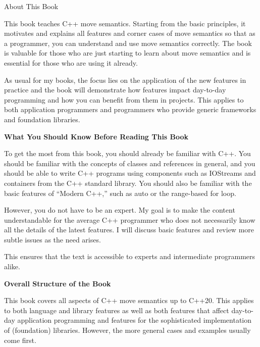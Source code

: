 \begin{flushright}
	 About This Book
\end{flushright}

This book teaches C++ move semantics. Starting from the basic principles, it motivates and explains all features and corner cases of move semantics so that as a programmer, you can understand and use move semantics correctly. The book is valuable for those who are just starting to learn about move semantics and
is essential for those who are using it already.\par

As usual for my books, the focus lies on the application of the new features in practice and the book will demonstrate how features impact day-to-day programming and how you can benefit from them in projects. This applies to both application programmers and programmers who provide generic frameworks and foundation libraries.\par

\hspace*{\fill} \par %
\textbf{What You Should Know Before Reading This Book}

To get the most from this book, you should already be familiar with C++. You should be familiar with the concepts of classes and references in general, and you should be able to write C++ programs using components such as IOStreams and containers from the C++ standard library. You should also be familiar with the basic features of “Modern C++,” such as auto or the range-based for loop.\par

However, you do not have to be an expert. My goal is to make the content understandable for the average C++ programmer who does not necessarily know all the details of the latest features. I will discuss basic features and review more subtle issues as the need arises.\par

This ensures that the text is accessible to experts and intermediate programmers alike.\par


\hspace*{\fill} \par %
\textbf{Overall Structure of the Book}

This book covers all aspects of C++ move semantics up to C++20. This applies to both language and library features as well as both features that affect day-to-day application programming and features for the sophisticated implementation of (foundation) libraries. However, the more general cases and examples usually come first.\par

